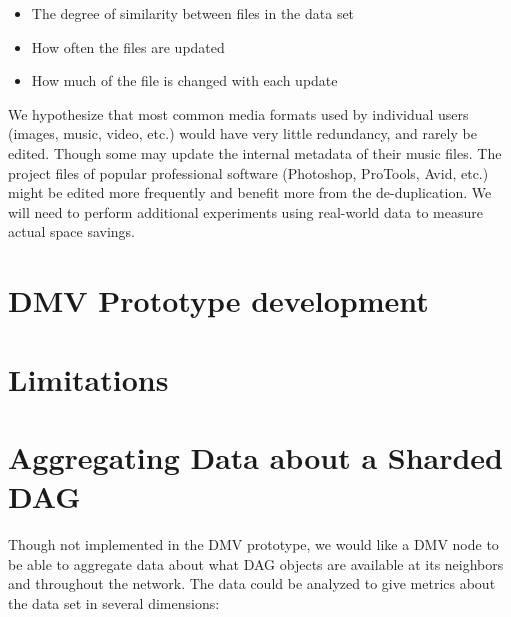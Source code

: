 \begin{itemize}

    \item The degree of similarity between files in the data set

    \item How often the files are updated

    \item How much of the file is changed with each update

\end{itemize}

We hypothesize that most common media formats used by individual users (images,
music, video, etc.) would have very little redundancy, and rarely be edited.
Though some may update the internal metadata of their music files. The project
files of popular professional software (Photoshop, ProTools, Avid, etc.) might
be edited more frequently and benefit more from the de-duplication. We will need
to perform additional experiments using real-world data to measure actual space
savings.

%


\section{DMV Prototype development}




%


\section{Limitations}



%


\section{Aggregating Data about a Sharded DAG}

Though not implemented in the \gls{DMV} prototype, we would like a \gls{DMV}
node to be able to aggregate data about what \gls{DAG} objects are available at
its neighbors and throughout the network. The data could be analyzed to give
metrics about the data set in several dimensions:

